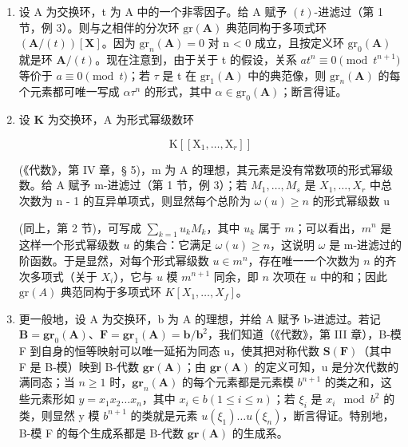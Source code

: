 \begin{enumerate}
\def\labelenumi{(\arabic{enumi})}
\item
	  设 A 为交换环，t 为 A 中的一个非零因子。给 A 赋予 \((t)\)-进滤过（第 1 节，例 3）。则与之相伴的分次环 \(\mathrm{gr}(\mathbf{A})\) 典范同构于多项式环 \((\mathbf{A}/(t))[\mathbf{X}]\)。因为 \(\mathrm{gr}_{n}(\mathbf{A}) = 0\) 对 n \textless{} 0 成立，且按定义环 \(\mathrm{gr}_{0}(\mathbf{A})\) 就是环 \(\mathbf{A}/(t)\)。现在注意到，由于关于 t 的假设，关系 \(at^{n} \equiv 0 \pmod{t^{n+1}}\) 等价于 \(a \equiv 0 \pmod{t}\)；若 \(\tau\) 是 t 在 \(\mathrm{gr}_{1}(\mathbf{A})\) 中的典范像，则 \(\mathrm{gr}_{n}(\mathbf{A})\) 的每个元素都可唯一写成 \(\alpha\tau^{n}\) 的形式，其中 \(\alpha \in \mathrm{gr}_{0}(\mathbf{A})\)；断言得证。
\item
  设 \(\mathbf{K}\) 为交换环，A 为形式幂级数环

\[
\mathrm{K} \left[ \left[ \mathrm{X} _ {1}, \dots , \mathrm{X} _ {r} \right] \right]
\]

(《代数》，第 IV 章，§ 5)，m 为 A 的理想，其元素是没有常数项的形式幂级数。给 A 赋予 m-进滤过（第 1 节，例 3）；若 \(M_{1}, \ldots, M_{s}\) 是 \(X_{1}, \ldots, X_{r}\) 中总次数为 n - 1 的互异单项式，则显然每个总阶为 \(\omega(u) \geqslant n\) 的形式幂级数 u

	(同上，第 2 节)，可写成 \(\sum_{k=1} u_k M_k\)，其中 \(u_k\) 属于 \(m\)；可以看出，\(m^n\) 是这样一个形式幂级数 \(u\) 的集合：它满足 \(\omega(u) \geqslant n\)，这说明 \(\omega\) 是 m-进滤过的阶函数。于是显然，对每个形式幂级数 \(u \in m^n\)，存在唯一一个次数为 \(n\) 的齐次多项式（关于 \(X_i\)），它与 \(u\) 模 \(m^{n+1}\) 同余，即 \(n\) 次项在 \(u\) 中的和；因此 \(\text{gr}(A)\) 典范同构于多项式环 \(K[X_1, \ldots, X_f]\)。

\item
	  更一般地，设 A 为交换环，b 为 A 的理想，并给 A 赋予 b-进滤过。若记 \(\mathbf{B} = \mathbf{gr}_{0}(\mathbf{A})\)、\(\mathbf{F} = \mathbf{gr}_{1}(\mathbf{A}) = \mathbf{b}/\mathbf{b}^{2}\)，我们知道（《代数》，第 III 章），B-模 F 到自身的恒等映射可以唯一延拓为同态 u，使其把对称代数 \(\mathbf{S}(\mathbf{F})\)（其中 F 是 B-模）映到 B-代数 \(\mathbf{gr}(\mathbf{A})\)；由 \(\mathbf{gr}(\mathbf{A})\) 的定义可知，u 是分次代数的满同态；当 \(n \geqslant 1\) 时，\(\mathbf{gr}_{n}(\mathbf{A})\) 的每个元素都是元素模 \(b^{n+1}\) 的类之和，这些元素形如 \(y = x_{1}x_{2}\ldots x_{n}\)，其中 \(x_{i} \in b (1 \leqslant i \leqslant n)\)；若 \(\xi_{i}\) 是 \(x_{i} \mod b^{2}\) 的类，则显然 y 模 \(b^{n+1}\) 的类就是元素 \(u(\xi_{1})\ldots u(\xi_{n})\)，断言得证。特别地，B-模 F 的每个生成系都是 B-代数 \(\mathbf{gr}(\mathbf{A})\) 的生成系。
\end{enumerate}

